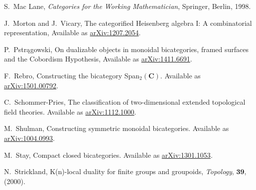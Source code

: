 \documentclass[11pt]{amsart}
\newcommand{\cat}[1]{\mathbf{#1}}
\theoremstyle{remark}
\theoremstyle{definition}
\begin{document}
\begin{thebibliography}{100}
S.~Mac Lane, 
\emph{Categories for the Working Mathematician},
Springer, Berlin, 1998.

J.\ Morton and J.\ Vicary,
The categorified Heisenberg algebra I: A combinatorial representation,
Available as \href{https://arxiv.org/abs/1207.2054}{arXiv:1207.2054}.

P.~Pstrągowski,
On dualizable objects in monoidal bicategories, framed surfaces and the Cobordism Hypothesis, 
Available as \href{https://arxiv.org/abs/1411.6691}{arXiv:1411.6691}.

F.~Rebro, 
Constructing the bicategory Span$_{2}(\cat{C})$. 
Available as \href{https://arxiv.org/abs/1501.00792}{arXiv:1501.00792}.

C.~Schommer-Pries,
The classification of two-dimensional extended topological field theories. 
Available as \href{https://arxiv.org/abs/1112.1000}{arXiv:1112.1000}.

M.~Shulman, 
Constructing symmetric monoidal bicategories. 
Available as \href{http://arxiv.org/abs/1004.0993}{arXiv:1004.0993}.

 M.~Stay, 
Compact closed bicategories. 
Available as \href{http://arxiv.org/abs/1301.1053}{arXiv:1301.1053}.

N.\ Strickland,
K(n)-local duality for finite groups and groupoids,
\emph{Topology}, $\mathbf{39}$, (2000).

\end{thebibliography}


%
%
\end{document}
